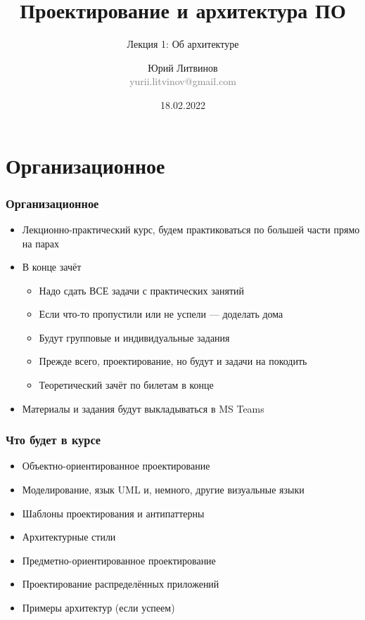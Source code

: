 \documentclass[xetex,mathserif,serif]{beamer}
\title{Проектирование и архитектура ПО}
\subtitle{Лекция 1: Об архитектуре}
\author[Юрий Литвинов]{Юрий Литвинов\\\small{\textcolor{gray}{yurii.litvinov@gmail.com}}}
\date{18.02.2022}
\begin{document}
    \frame{\titlepage}

    \section{Организационное}

    \begin{frame}
        \frametitle{Организационное}
        \begin{itemize}
            \item Лекционно-практический курс, будем практиковаться по большей части прямо на парах
            \item В конце зачёт
            \begin{itemize}
                \item Надо сдать ВСЕ задачи с практических занятий
                \item Если что-то пропустили или не успели --- доделать дома
                \item Будут групповые и индивидуальные задания
                \item Прежде всего, проектирование, но будут и задачи на покодить
                \item Теоретический зачёт по билетам в конце
            \end{itemize}
            \item Материалы и задания будут выкладываться в MS Teams
        \end{itemize}
    \end{frame}

    \begin{frame}
        \frametitle{Что будет в курсе}
        \begin{itemize}
            \item Объектно-ориентированное проектирование
            \item Моделирование, язык UML и, немного, другие визуальные языки
            \item Шаблоны проектирования и антипаттерны
            \item Архитектурные стили
            \item Предметно-ориентированное проектирование
            \item Проектирование распределённых приложений
            \item Примеры архитектур (если успеем)
        \end{itemize}
    \end{frame}
\end{document}
